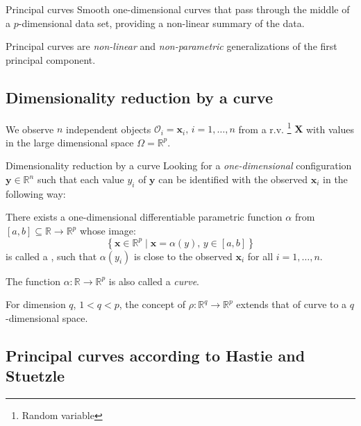 \begin{definition}{Principal curves}{}
	Smooth one-dimensional curves that pass through the middle of a
	$p$-dimensional data set, providing a non-linear summary of the data.
	\cite{hastie_principal_1989}
	\tcblower
	\begin{note}
		Principal curves are \emph{non-linear} and \emph{non-parametric} generalizations
		of the first principal component.
	\end{note}
\end{definition}

\subsection{Dimensionality reduction by a curve}
We observe $n$ independent objects $\mathcal{O}_i = \boldsymbol{x}_i,\, i = 1, \dots, n$ from
a r.v.%
\footnote{Random variable}
$\boldsymbol{X}$ with values in the large dimensional space $\Omega = \mathds{R}^p$.
\begin{problem}{Dimensionality reduction by a curve}{}
Looking for a \emph{one-dimensional} configuration $\boldsymbol{y} \in \mathds{R}^n$ such
that each value $y_i$ of $\boldsymbol{y}$ can be identified with the observed
$\boldsymbol{x}_i$ in the following way:

There exists a one-dimensional differentiable parametric function $\alpha$ from
$[a, b] \subseteq \mathds{R} \to \mathds{R}^p$ whose image:
\begin{equation*}
	\left\{ \boldsymbol{x} \in \mathds{R}^p \mid \boldsymbol{x} = \alpha(y), \, y \in [a, b]  \right\}
\end{equation*}
is called a , such that $\alpha(y_i)$ is close to the observed $\boldsymbol{x}_i$ for
all $i = 1, \dots, n$.
\tcblower
\begin{note}
	The function $\alpha : \mathds{R} \to \mathds{R}^p$ is also called a \emph{curve}.
\end{note}
\begin{note}
	For dimension $q$, $1 < q < p$, the concept of  $\rho: \mathds{R}^q \to \mathds{R}^p$
	extends that of curve to a $q$-dimensional space.
\end{note}
\end{problem}

\subsection{Principal curves according to Hastie and Stuetzle}


